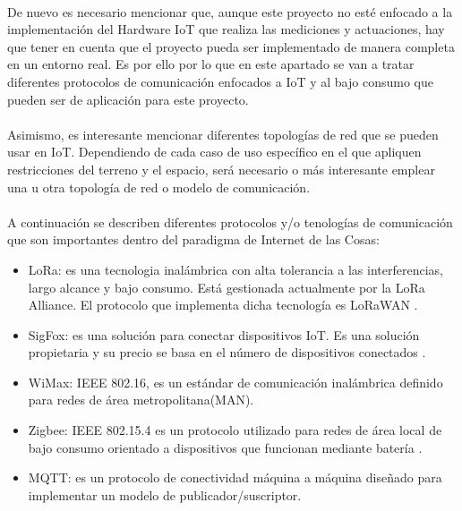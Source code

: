 \documentclass[../../memoria.tex]{subfiles}
\begin{document}
\paragraph{}
De nuevo es necesario mencionar que, aunque este proyecto no esté enfocado a la implementación del Hardware IoT que realiza las mediciones y actuaciones, hay que tener en cuenta que el proyecto pueda ser implementado de manera completa en un entorno real. Es por ello por lo que en este apartado se van a tratar diferentes protocolos de comunicación enfocados a IoT y al bajo consumo que pueden ser de aplicación para este proyecto.

\paragraph{}
Asimismo, es interesante mencionar diferentes topologías de red que se pueden usar en IoT. Dependiendo de cada caso de uso específico en el que apliquen restricciones del terreno y el espacio, será necesario o más interesante emplear una u otra topología de red o modelo de comunicación.

\paragraph{}
A continuación se describen diferentes protocolos y/o tenologías de comunicación que son importantes dentro del paradigma de Internet de las Cosas:

\begin{itemize}
    \item LoRa: es una tecnologia inalámbrica con alta tolerancia a las interferencias, largo alcance y bajo consumo. Está gestionada actualmente por la LoRa Alliance. El protocolo que implementa dicha tecnología es LoRaWAN \cite{lora} \cite{loratech}.

    \item SigFox: es una solución para conectar dispositivos IoT. Es una solución propietaria y su precio se basa en el número de dispositivos conectados \cite{sigfox}.

    \item WiMax: IEEE 802.16, es un estándar de comunicación inalámbrica definido para redes de área metropolitana(MAN). \cite{wimax}

    \item Zigbee: IEEE 802.15.4 es un protocolo utilizado para redes de área local de bajo consumo orientado a dispositivos que funcionan mediante batería \cite{zigbee}.

    \item MQTT: es un protocolo de conectividad máquina a máquina diseñado para implementar un modelo de publicador/suscriptor. \cite{mqtt}

\end{itemize}
\end{document}
